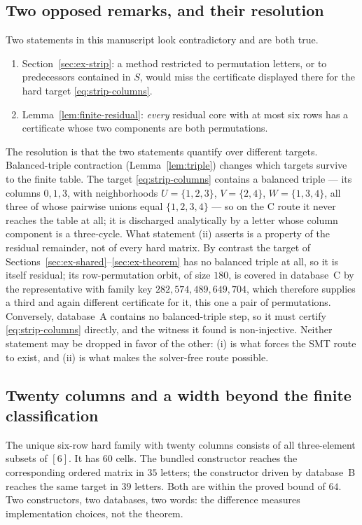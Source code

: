 \documentclass[11pt,letterpaper]{article}
\numberwithin{equation}{section}
\theoremstyle{definition}
\theoremstyle{remark}
\newcommand{\dbA}{\textsf{A}}
\newcommand{\dbB}{\textsf{B}}
\newcommand{\dbC}{\textsf{C}}
\begin{document}
\subsection{Two opposed remarks, and their resolution}
\label{sec:opposed}
Two statements in this manuscript look contradictory and are both true.

\begin{enumerate}[label=(\roman*)]
\item Section~\ref{sec:ex-strip}: a method restricted to permutation letters,
or to predecessors contained in $S$, would miss the certificate displayed
there for the hard target \eqref{eq:strip-columns}.
\item Lemma~\ref{lem:finite-residual}: \emph{every} residual core with at most
six rows has a certificate whose two components are both permutations.
\end{enumerate}

The resolution is that the two statements quantify over different targets.
Balanced-triple contraction (Lemma~\ref{lem:triple}) changes which targets
survive to the finite table. The target \eqref{eq:strip-columns} contains a
balanced triple --- its columns $0,1,3$, with neighborhoods
$U=\{1,2,3\}$, $V=\{2,4\}$, $W=\{1,3,4\}$, all three of whose pairwise
unions equal $\{1,2,3,4\}$ --- so on the
\dbC{} route it never reaches the table at all; it is discharged
analytically by a letter whose column component is a three-cycle. What
statement (ii) asserts is a property of the residual remainder, not of every
hard matrix. By contrast the target of
Sections~\ref{sec:ex-shared}--\ref{sec:ex-theorem} has no balanced triple at
all, so it is itself residual; its row-permutation orbit, of size $180$, is
covered in database~\dbC{} by the representative with family key
$282{,}574{,}489{,}649{,}704$, which therefore supplies a third and again
different certificate for it, this one a pair of permutations.
Conversely, database~\dbA{} contains no balanced-triple step,
so it must certify \eqref{eq:strip-columns} directly, and the witness it
found is non-injective. Neither statement may be dropped in favor of the
other: (i) is what forces the SMT route to exist, and (ii) is what makes the
solver-free route possible.

\subsection{Twenty columns and a width beyond the finite classification}
The unique six-row hard family with twenty columns consists of all
three-element subsets of $[6]$. It has $60$ cells. The bundled constructor
reaches the corresponding ordered matrix in $35$ letters; the constructor
driven by database~\dbB{} reaches the same target in $39$ letters. Both are
within the proved bound of $64$. Two constructors, two databases, two words:
the difference measures implementation choices, not the theorem.
\end{document}
